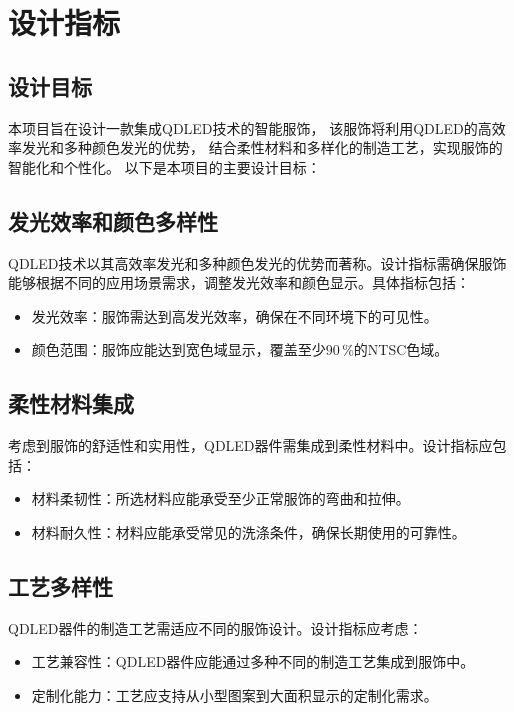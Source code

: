 \documentclass[12pt,hyperref,a4paper,UTF8]{ctexart}
\begin{document}
\newpage



\section{设计指标}

\subsection*{设计目标}
本项目旨在设计一款集成QDLED技术的智能服饰，
该服饰将利用QDLED的高效率发光和多种颜色发光的优势，
结合柔性材料和多样化的制造工艺，实现服饰的智能化和个性化。
以下是本项目的主要设计目标：


\subsection*{发光效率和颜色多样性}
QDLED技术以其高效率发光和多种颜色发光的优势而著称。设计指标需确保服饰能够根据不同的应用场景需求，调整发光效率和颜色显示。具体指标包括：
\begin{itemize}
  \item 发光效率：服饰需达到高发光效率，确保在不同环境下的可见性。
  \item 颜色范围：服饰应能达到宽色域显示，覆盖至少\( \boxed{90 \, \%} \)的NTSC色域。
\end{itemize}

\subsection*{柔性材料集成}
考虑到服饰的舒适性和实用性，QDLED器件需集成到柔性材料中。设计指标应包括：
\begin{itemize}
  \item 材料柔韧性：所选材料应能承受至少正常服饰的弯曲和拉伸。
  \item 材料耐久性：材料应能承受常见的洗涤条件，确保长期使用的可靠性。
\end{itemize}

\subsection*{工艺多样性}
QDLED器件的制造工艺需适应不同的服饰设计。设计指标应考虑：
\begin{itemize}
  \item 工艺兼容性：QDLED器件应能通过多种不同的制造工艺集成到服饰中。
  \item 定制化能力：工艺应支持从小型图案到大面积显示的定制化需求。
\end{itemize}
\end{document}
